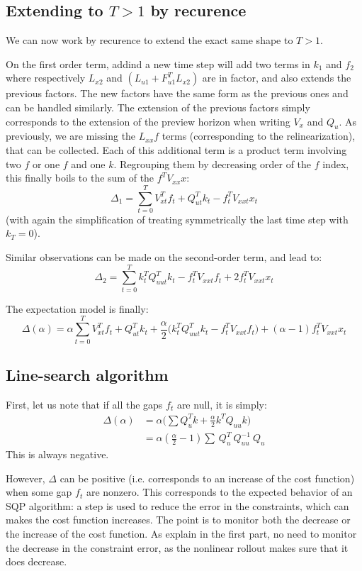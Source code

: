 \documentclass[10pt,a4paper]{article}
\begin{document}
\subsection{Extending to $T>1$ by recurence}
We can now work by recurence to extend the exact same shape to $T>1$.

On the first order term, addind a new time step will add two terms in $k_1$ and $f_2$ where respectively $L_{x2}$ and $(L_{u1} + F_{u1}^T L_{x2})$ are in factor, and also extends the previous factors.
The new factors have the same form as the previous ones and can be handled similarly.
The extension of the previous factors simply corresponds to the extension of the preview horizon when writing $V_x$ and $Q_u$.
As previously, we are missing the $L_{xx} f$ terms (corresponding to the relinearization), that can be collected.
Each of this additional term is a product term involving two $f$ or one $f$ and one $k$.
Regrouping them by decreasing order of the $f$ index, this finally boils to the sum of the $f^T V_{xx} x$:
$$\Delta_1 = \sum_{t=0}^T V_{xt}^T f_t + Q_{ut}^T k_t - f_t^T V_{xxt} x_t $$
(with again the simplification of treating symmetrically the last time step with $k_T=0$).

Similar observations can be made on the second-order term, and lead to:
$$\Delta_2 = \sum_{t=0}^T k_t^T Q_{uut}^T k_t-f_t^T V_{xxt} f_t +2 f_t^T V_{xxt} x_t $$


The expectation model is finally:
$$\Delta(\alpha) = \alpha \sum_{t=0}^T V_{xt}^T f_t + Q_{ut}^T k_t 
+ \frac{\alpha}{2} \Big( k_t^T Q_{uut}^T k_t-f_t^T V_{xxt} f_t \Big)
+ (\alpha-1) f_t^T V_{xxt} x_t$$


\subsection{Line-search algorithm}

First, let us note that if all the gaps $f_t$ are null, it is simply:
\begin{align*}
  \Delta(\alpha) &= \alpha \big( \sum Q_u^T k + \frac{\alpha}{2} k^T Q_{uu} k \big) \\
  &= \alpha(\frac{\alpha}{2} - 1) \sum  \ Q_u^T\ Q_{uu}^{-1} \ Q_u
\end{align*}
This is always negative.

However, $\Delta$ can be positive (i.e. corresponds to an increase of the cost function) when some gap $f_t$ are nonzero.
This corresponds to the expected behavior of an SQP algorithm: a step is used to reduce the error in the constraints, which can makes the cost function increases.
The point is to monitor both the decrease or the increase of the cost function.
As explain in the first part, no need to monitor the decrease in the constraint error, as the nonlinear rollout makes sure that it does decrease.







{
\small

}
\end{document}
